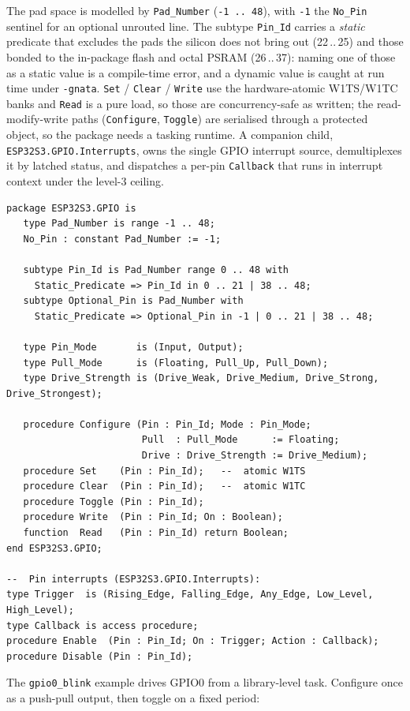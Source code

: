 The pad space is modelled by \texttt{Pad\_Number} (\texttt{-1\,..\,48}), with
\texttt{-1} the \texttt{No\_Pin} sentinel for an optional unrouted line. The
subtype \texttt{Pin\_Id} carries a \emph{static} predicate that excludes the
pads the silicon does not bring out (22\,..\,25) and those bonded to the
in-package flash and octal PSRAM (26\,..\,37): naming one of those as a static
value is a compile-time error, and a dynamic value is caught at run time under
\texttt{-gnata}. \texttt{Set} / \texttt{Clear} / \texttt{Write} use the
hardware-atomic W1TS/W1TC banks and \texttt{Read} is a pure load, so those are
concurrency-safe as written; the read-modify-write paths (\texttt{Configure},
\texttt{Toggle}) are serialised through a protected object, so the package needs
a tasking runtime. A companion child, \texttt{ESP32S3.GPIO.Interrupts}, owns the
single GPIO interrupt source, demultiplexes it by latched status, and dispatches
a per-pin \texttt{Callback} that runs in interrupt context under the level-3
ceiling.

\begin{lstlisting}
package ESP32S3.GPIO is
   type Pad_Number is range -1 .. 48;
   No_Pin : constant Pad_Number := -1;

   subtype Pin_Id is Pad_Number range 0 .. 48 with
     Static_Predicate => Pin_Id in 0 .. 21 | 38 .. 48;
   subtype Optional_Pin is Pad_Number with
     Static_Predicate => Optional_Pin in -1 | 0 .. 21 | 38 .. 48;

   type Pin_Mode       is (Input, Output);
   type Pull_Mode      is (Floating, Pull_Up, Pull_Down);
   type Drive_Strength is (Drive_Weak, Drive_Medium, Drive_Strong, Drive_Strongest);

   procedure Configure (Pin : Pin_Id; Mode : Pin_Mode;
                        Pull  : Pull_Mode      := Floating;
                        Drive : Drive_Strength := Drive_Medium);
   procedure Set    (Pin : Pin_Id);   --  atomic W1TS
   procedure Clear  (Pin : Pin_Id);   --  atomic W1TC
   procedure Toggle (Pin : Pin_Id);
   procedure Write  (Pin : Pin_Id; On : Boolean);
   function  Read   (Pin : Pin_Id) return Boolean;
end ESP32S3.GPIO;

--  Pin interrupts (ESP32S3.GPIO.Interrupts):
type Trigger  is (Rising_Edge, Falling_Edge, Any_Edge, Low_Level, High_Level);
type Callback is access procedure;
procedure Enable  (Pin : Pin_Id; On : Trigger; Action : Callback);
procedure Disable (Pin : Pin_Id);
\end{lstlisting}

The \texttt{gpio0\_blink} example drives GPIO0 from a library-level task.
Configure once as a push-pull output, then toggle on a fixed period:


